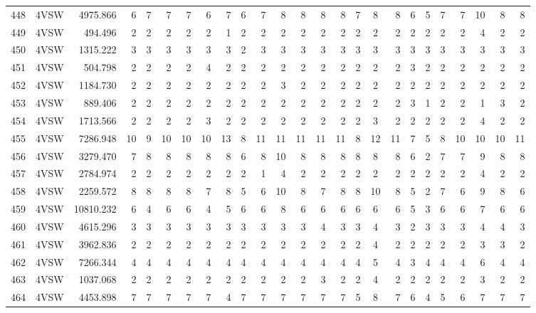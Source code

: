 \documentclass[12pt]{article}\usepackage[]{graphicx}\usepackage[]{color}
\begin{document}
\begin{landscapepage}
\begin{longtable}[t]{crrrrrrrrrrrrrrrcrrrrrrrr}
448 & 4VSW & 4975.866 & 6 & 7 & 7 & 7 & 6 & 7 & 6 & 7 & 8 & 8 & 8 & 8 & 7 & 8 & 8 & 6 & 5 & 7 & 7 & 10 & 8 & 8\\
449 & 4VSW & 494.496 & 2 & 2 & 2 & 2 & 2 & 1 & 2 & 2 & 2 & 2 & 2 & 2 & 2 & 2 & 2 & 2 & 2 & 2 & 2 & 4 & 2 & 2\\
450 & 4VSW & 1315.222 & 3 & 3 & 3 & 3 & 3 & 3 & 2 & 3 & 3 & 3 & 3 & 3 & 3 & 3 & 3 & 3 & 3 & 3 & 3 & 3 & 3 & 3\\
451 & 4VSW & 504.798 & 2 & 2 & 2 & 2 & 4 & 2 & 2 & 2 & 2 & 2 & 2 & 2 & 2 & 2 & 2 & 3 & 2 & 2 & 2 & 2 & 2 & 2\\
452 & 4VSW & 1184.730 & 2 & 2 & 2 & 2 & 2 & 2 & 2 & 2 & 3 & 2 & 2 & 2 & 2 & 2 & 2 & 2 & 2 & 2 & 2 & 2 & 2 & 2\\
453 & 4VSW & 889.406 & 2 & 2 & 2 & 2 & 2 & 2 & 2 & 2 & 2 & 2 & 2 & 2 & 2 & 2 & 2 & 3 & 1 & 2 & 2 & 1 & 3 & 2\\
454 & 4VSW & 1713.566 & 2 & 2 & 2 & 2 & 3 & 2 & 2 & 2 & 2 & 2 & 2 & 2 & 2 & 3 & 2 & 2 & 2 & 2 & 2 & 4 & 2 & 2\\
455 & 4VSW & 7286.948 & 10 & 9 & 10 & 10 & 10 & 13 & 8 & 11 & 11 & 11 & 11 & 11 & 8 & 12 & 11 & 7 & 5 & 8 & 10 & 10 & 10 & 11\\
456 & 4VSW & 3279.470 & 7 & 8 & 8 & 8 & 8 & 8 & 6 & 8 & 10 & 8 & 8 & 8 & 8 & 8 & 8 & 6 & 2 & 7 & 7 & 9 & 8 & 8\\
457 & 4VSW & 2784.974 & 2 & 2 & 2 & 2 & 2 & 2 & 2 & 1 & 4 & 2 & 2 & 2 & 2 & 2 & 2 & 2 & 2 & 2 & 2 & 4 & 2 & 2\\
458 & 4VSW & 2259.572 & 8 & 8 & 8 & 8 & 7 & 8 & 5 & 6 & 10 & 8 & 7 & 8 & 8 & 10 & 8 & 5 & 2 & 7 & 6 & 9 & 8 & 6\\
459 & 4VSW & 10810.232 & 6 & 4 & 6 & 6 & 4 & 5 & 6 & 6 & 8 & 6 & 6 & 6 & 6 & 6 & 6 & 5 & 3 & 6 & 6 & 7 & 6 & 6\\
460 & 4VSW & 4615.296 & 3 & 3 & 3 & 3 & 3 & 3 & 3 & 3 & 3 & 3 & 4 & 3 & 3 & 4 & 3 & 2 & 3 & 3 & 3 & 4 & 4 & 3\\
461 & 4VSW & 3962.836 & 2 & 2 & 2 & 2 & 2 & 2 & 2 & 2 & 2 & 2 & 2 & 2 & 2 & 4 & 2 & 2 & 2 & 2 & 2 & 3 & 3 & 2\\
462 & 4VSW & 7266.344 & 4 & 4 & 4 & 4 & 4 & 4 & 4 & 4 & 4 & 4 & 4 & 4 & 4 & 5 & 4 & 3 & 4 & 4 & 4 & 6 & 4 & 4\\
463 & 4VSW & 1037.068 & 2 & 2 & 2 & 2 & 2 & 2 & 2 & 2 & 2 & 2 & 3 & 2 & 2 & 4 & 2 & 2 & 2 & 2 & 2 & 3 & 2 & 2\\
464 & 4VSW & 4453.898 & 7 & 7 & 7 & 7 & 7 & 4 & 7 & 7 & 7 & 7 & 7 & 7 & 5 & 8 & 7 & 6 & 4 & 5 & 6 & 7 & 7 & 7\\

\end{longtable}
\end{landscapepage}
\end{document}
